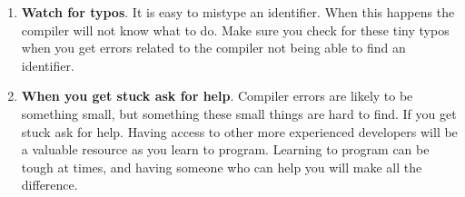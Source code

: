 \begin{enumerate}
  \item \textbf{Watch for typos}. It is easy to mistype an identifier. When this happens the compiler will not know what to do. Make sure you check for these tiny typos when you get errors related to the compiler not being able to find an identifier.
  \item \textbf{When you get stuck ask for help}. Compiler errors are likely to be something small, but something these small things are hard to find. If you get stuck ask for help. Having access to other more experienced developers will be a valuable resource as you learn to program. Learning to program can be tough at times, and having someone who can help you will make all the difference.
\end{enumerate}



